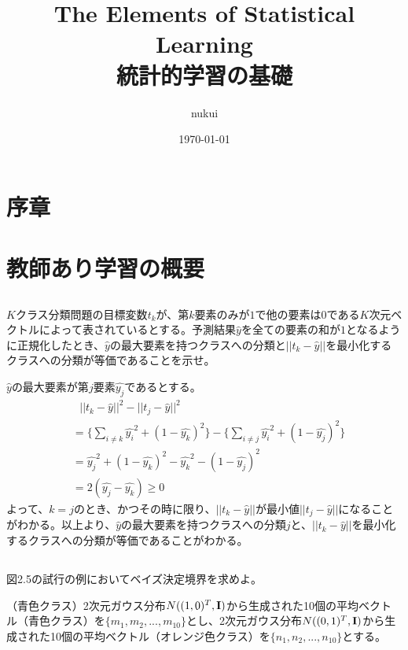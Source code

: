 \documentclass{jsarticle}
\begin{document}
\title{The Elements of Statistical Learning\\統計的学習の基礎}
\author{nukui}
\date{\today}
\maketitle



\section{序章}
\section{教師あり学習の概要}
\subsection{}
\begin{shadebox}
$K$クラス分類問題の目標変数$t_k$が、第$k$要素のみが$1$で他の要素は$0$である$K$次元ベクトルによって表されているとする。予測結果$\hat{y}$を全ての要素の和が$1$となるように正規化したとき、$\hat{y}$の最大要素を持つクラスへの分類と$||t_k-\hat{y}||$を最小化するクラスへの分類が等価であることを示せ。
\end{shadebox}
$\hat{y}$の最大要素が第$j$要素$\hat{y_j}$であるとする。
\begin{align*}
&\ \ \ ||t_k-\hat{y}||^2-||t_j-\hat{y}||^2\\
&=\{\sum_{i\neq k}\hat{y_i}^2+(1-\hat{y_k})^2\}-\{\sum_{i\neq j}\hat{y_i}^2+(1-\hat{y_j})^2\}\\
&=\hat{y_j}^2+(1-\hat{y_k})^2-\hat{y_k}^2-(1-\hat{y_j})^2\\
&=2(\hat{y_j}-\hat{y_k})\geq0
\end{align*}
よって、$k=j$のとき、かつその時に限り、$||t_k-\hat{y}||$が最小値$||t_j-\hat{y}||$になることがわかる。以上より、$\hat{y}$の最大要素を持つクラスへの分類$j$と、$||t_k-\hat{y}||$を最小化するクラスへの分類が等価であることがわかる。


\subsection{}
\begin{shadebox}
図2.5の試行の例においてベイズ決定境界を求めよ。
\end{shadebox}
（青色クラス）2次元ガウス分布$N((1,0)^T,\bf{I})$から生成された10個の平均ベクトル（青色クラス）を$\{m_1,m_2,...,m_{10}\}$とし、2次元ガウス分布$N((0,1)^T,\bf{I})$から生成された10個の平均ベクトル（オレンジ色クラス）を$\{n_1,n_2,...,n_{10}\}$とする。
\end{document}
